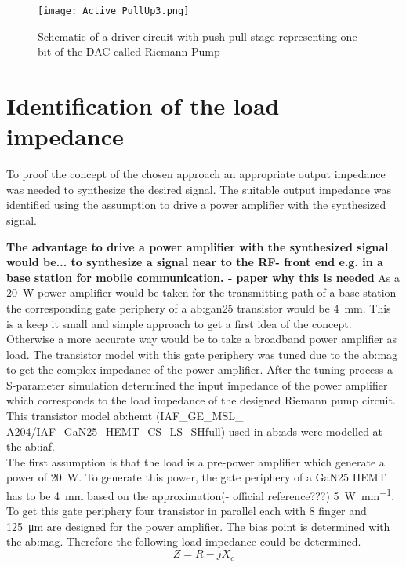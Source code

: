 \begin{figure}[ht]
	\centering
  \texttt{[image: Active\_PullUp3.png]}
	\caption{Schematic of a driver circuit with push-pull stage representing one bit of the DAC called Riemann Pump}
	\label{RiemannPump}
\end{figure}

 


\section{Identification of the load impedance}
To proof the concept of the chosen approach an appropriate output impedance was needed to synthesize the desired signal.
The suitable output impedance was identified using the assumption to drive a power amplifier with the synthesized signal.

\textbf{The advantage to drive a power amplifier with the synthesized signal would be... to synthesize a signal near to the RF- front end e.g. in a base station for mobile communication. - paper why this is needed}
As a \SI{20}{\watt} power amplifier would be taken for the transmitting path of a base station the corresponding gate periphery of a \gls{ab:gan}25 transistor would be \SI{4}{\milli \metre}.
This is a keep it small and simple approach to get a first idea of the concept. Otherwise a more accurate way would be to take a broadband power amplifier as load.
The transistor model with this gate periphery was tuned due to the \gls{ab:mag} to get the complex impedance of the power amplifier.
After the tuning process a S-parameter simulation determined the input impedance of the power amplifier which corresponds to the load impedance of the designed Riemann pump circuit.
This transistor model \gls{ab:hemt} (IAF\_GE\_MSL\_ A204/IAF\_GaN25\_HEMT\_CS\_LS\_SHfull) used in \gls{ab:ads} were modelled at the \gls{ab:iaf}.\\

 The first assumption is that the load is a pre-power amplifier which generate a power of \SI{20}{\watt}. To generate this power, the gate periphery of a GaN25 HEMT has to be \SI{4}{\milli \metre} based on the approximation(- official reference???) \SI[per-mode=fraction]{5}{\watt\per\milli\metre}. To get this gate periphery four transistor in parallel each with 8 finger and \SI{125}{\micro \metre} are designed for the power amplifier. The bias point is determined with the \gls{ab:mag}. Therefore the following load impedance could be determined.
\begin{equation}
Z = R - jX_c
\end{equation}

